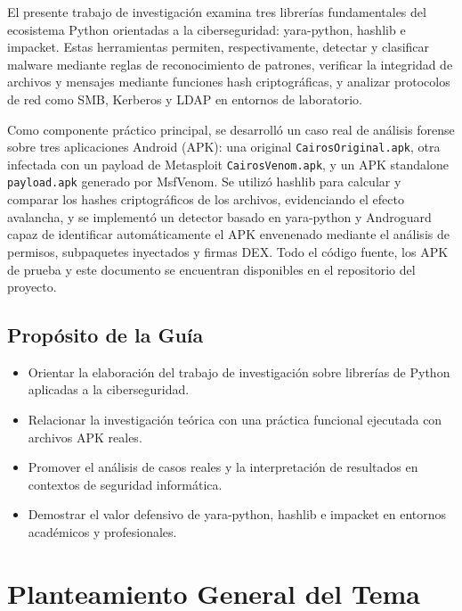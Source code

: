 \documentclass[12pt,a4paper]{article}
\begin{document}
El presente trabajo de investigación examina tres librerías
fundamentales del ecosistema Python orientadas a la ciberseguridad:
yara-python, hashlib e impacket. Estas herramientas permiten,
respectivamente, detectar y clasificar malware mediante reglas de
reconocimiento de patrones, verificar la integridad de archivos y
mensajes mediante funciones hash criptográficas, y analizar protocolos
de red como SMB, Kerberos y LDAP en entornos de laboratorio.

Como componente práctico principal, se desarrolló un caso real de
análisis forense sobre tres aplicaciones Android (APK): una original
\texttt{CairosOriginal.apk}, otra infectada con un payload de Metasploit
\texttt{CairosVenom.apk}, y un APK standalone \texttt{payload.apk}
generado por MsfVenom. Se utilizó hashlib para calcular y comparar los
hashes criptográficos de los archivos, evidenciando el efecto avalancha,
y se implementó un detector basado en yara-python y Androguard capaz de
identificar automáticamente el APK envenenado mediante el análisis de
permisos, subpaquetes inyectados y firmas DEX. Todo el código fuente,
los APK de prueba y este documento se encuentran disponibles en el
repositorio del proyecto.

\subsection{Propósito de la Guía}

\begin{itemize}
\item Orientar la elaboración del trabajo de investigación sobre librerías de
  Python aplicadas a la ciberseguridad.
\item Relacionar la investigación teórica con una práctica funcional
  ejecutada con archivos APK reales.
\item Promover el análisis de casos reales y la interpretación de resultados
  en contextos de seguridad informática.
\item Demostrar el valor defensivo de yara-python, hashlib e impacket en
  entornos académicos y profesionales.
\end{itemize}

\section{Planteamiento General del Tema}
\end{document}

